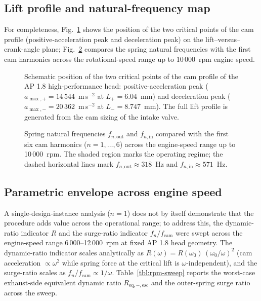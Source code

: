 \subsection{Lift profile and natural-frequency map}
\label{sec:res-curves}

For completeness, Fig.~\ref{fig:lift} shows the position of the two
critical points of the cam profile (positive-acceleration peak and
deceleration peak) on the lift--versus--crank-angle plane;
Fig.~\ref{fig:fn} compares the spring natural frequencies with the
first cam harmonics across the rotational-speed range up to
10\,000~rpm engine speed.

\begin{figure}[!htbp]
  \centering
  \resizebox{\linewidth}{!}{}
  \caption{Schematic position of the two critical points of the cam profile of the AP 1.8 high-performance head: positive-acceleration peak ($a_{\max,+}=14\,544$~m\,s$^{-2}$ at $L_{+}=6.04$~mm) and deceleration peak ($a_{\max,-}=20\,362$~m\,s$^{-2}$ at $L_{-}=8.747$~mm). The full lift profile is generated from the cam sizing of the intake valve.}\label{fig:lift}
\end{figure}

\begin{figure}[!htbp]
  \centering
  \resizebox{\linewidth}{!}{}
  \caption{Spring natural frequencies $f_{n,\mathrm{out}}$ and $f_{n,\mathrm{in}}$ compared with the first six cam harmonics ($n=1,\dots,6$) across the engine-speed range up to 10\,000~rpm. The shaded region marks the operating regime; the dashed horizontal lines mark $f_{n,\mathrm{out}}\approx 318$~Hz and $f_{n,\mathrm{in}}\approx 571$~Hz.}\label{fig:fn}
\end{figure}

\subsection{Parametric envelope across engine speed}
\label{sec:res-envelope}

A single-design-instance analysis ($n=1$) does not by itself
demonstrate that the procedure adds value across the operational
range; to address this, the dynamic-ratio indicator $R$ and the
surge-ratio indicator $f_{n}/f_{\mathrm{cam}}$ were swept across the
engine-speed range 6\,000--12\,000~rpm at fixed AP 1.8 head
geometry. The dynamic-ratio indicator scales analytically as
$R(\omega)=R(\omega_{0})\,(\omega_{0}/\omega)^{2}$ (cam acceleration
$\propto \omega^{2}$ while spring force at the critical lift is
$\omega$-independent), and the surge-ratio scales as
$f_{n}/f_{\mathrm{cam}}\propto 1/\omega$. Table~\ref{tbl:rpm-sweep}
reports the worst-case exhaust-side equivalent dynamic ratio
$R_{\mathrm{eq},-,\mathrm{esc}}$ and the outer-spring surge ratio
across the sweep.

